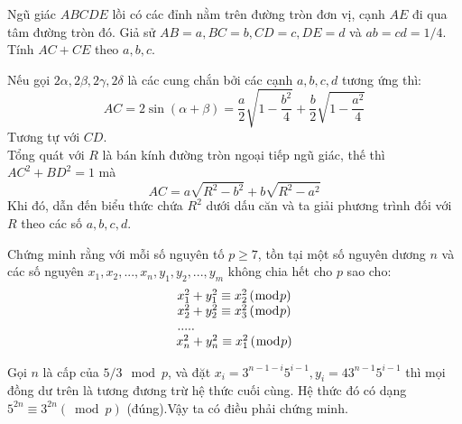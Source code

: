 \begin{baitap}
Ngũ giác $ABCDE$ lồi có các đỉnh nằm trên đường tròn đơn vị, cạnh $AE$ đi qua tâm đường tròn đó. Giả sử $AB=a,BC=b,CD=c,DE=d$ và $ab=cd=1/4$. Tính $AC+CE$ theo $a,b,c.$

\begin{loigiai5}
Nếu gọi $2\alpha ,2\beta ,2\gamma ,2\delta $ là các cung chắn bởi các cạnh $a,b,c,d$ tương ứng thì:
$$ AC = 2\sin \left( {\alpha  + \beta } \right) = \frac{a}{2}\sqrt {1 - \frac{{b^2 }}{4}}  + \frac{b}{2}\sqrt {1 - \frac{{a^2 }}{4}} $$
Tương tự với $CD$.\\
Tổng quát với $R$ là bán kính đường tròn ngoại tiếp ngũ giác, thế thì $AC^2+BD^2=1$ mà
$$  AC = a\sqrt {R^2  - b^2 }  + b\sqrt {R^2  - a^2 } $$
Khi đó, dẫn đến biểu thức chứa $R^2$ dưới dấu căn và ta giải phương trình đối với $R$ theo các số $a,b,c,d$. 
\end{loigiai5}
\end{baitap}

\begin{baitap}
Chứng minh rằng với mỗi số nguyên tố $p \ge 7$, tồn tại một số nguyên dương $n$ và các số nguyên $x_1,x_2,...,x_n,y_1,y_2,...,y_m$ không chia hết cho $p$ sao cho:
$$\begin{array}{*{20}c}
   {x_1^2  + y_1^2  \equiv x_2^2 \left( {\bmod p} \right)}  \\
   \begin{array}{l}
 x_2^2  + y_2^2  \equiv x_3^2 \left( {\bmod p} \right) \\ 
 ..... \\ 
 \end{array}  \\
   {x_n^2  + y_n^2  \equiv x_1^2 \left( {\bmod p} \right)}  \\
\end{array}$$

\begin{loigiai5}
 Gọi $n$ là cấp của $5/3 \mod p$, và đặt $x_i=3^{n-1-i}5^{i-1}, y_i=43^{n-1}5^{i-1}$ thì mọi đồng dư trên là tương đương trừ hệ thức cuối cùng. Hệ thức đó có dạng $5^{2n}  \equiv 3^{2n} \left( {\bmod p} \right)$ (đúng).Vậy ta có điều phải chứng minh.
\end{loigiai5}
\end{baitap}

